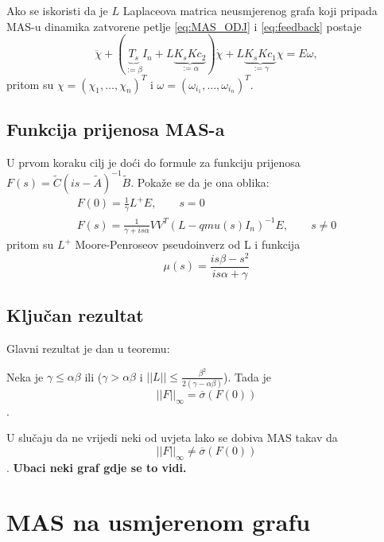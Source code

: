 Ako se iskoristi da je $L$ Laplaceova matrica neusmjerenog grafa koji pripada MAS-u dinamika zatvorene petlje \eqref{eq:MAS_ODJ} i \eqref{eq:feedback} postaje
\begin{equation}
    \ddot{\chi} + ( \underbrace{T_s}_{:= \beta} I_n + L \underbrace{K_sKc_2}_{:= \alpha} )\dot{\chi} + L \underbrace{K_sKc_1}_{:= \gamma} \chi = E\omega,
    \label{eq:cijeli sustav}
\end{equation}
pritom su $\chi = \left(\chi_1, \dots, \chi_n\right)^T$ i $\omega = \left(\omega_{i_1}, \dots, \omega_{i_n}\right)^T$.

\subsection{Funkcija prijenosa MAS-a}
U prvom koraku cilj je doći do formule za funkciju prijenosa $F(s)= \tilde{C}(is - \tilde{A})^{-1}\tilde{B}$. Pokaže se da je ona oblika:
\begin{align}
    F(0) = \frac{1}{\gamma}L^{+}E, \qquad s=0\\
    F(s) = \frac{1}{\gamma+is\alpha}V V^T (L- qmu(s) I_n)^{-1}E, \qquad s \neq 0
\end{align} pritom su $L^{+}$ Moore-Penroseov pseudoinverz od L i funkcija
$$\mu(s)=\frac{is\beta -s^2}{is \alpha + \gamma} $$

\subsection{Ključan rezultat}
Glavni rezultat je dan u teoremu:
\begin{thm}
    Neka je $\gamma \leq \alpha \beta$ ili ($\gamma > \alpha \beta$ i $||L||\leq \frac{\beta^2}{2(\gamma-\alpha \beta)}$). Tada je
    $$||F||_\infty = {\overline\sigma}(F(0))$$.
\end{thm}

\begin{rem}
    U slučaju da ne vrijedi neki od uvjeta lako se dobiva MAS takav da
    $$||F||_\infty \neq {\overline\sigma}(F(0))$$.
    \textbf{Ubaci neki graf gdje se to vidi.}
\end{rem}


\section[MAS na usmjerenom grafu][MAS na usmjerenom grafu]{MAS na usmjerenom grafu}



